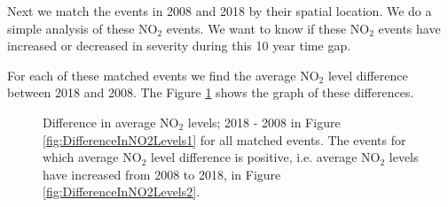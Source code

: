 \documentclass[11pt]{article}
\begin{document}
	
	Next we match the events in 2008 and 2018 by their spatial location. We do a simple analysis of these $\text{NO}_2$ events. We want to know if these  $\text{NO}_2$ events have increased or decreased in severity during this 10 year time gap. 

	
	For each of these matched events we find the  average $\text{NO}_2$ level difference between 2018 and 2008. The Figure \ref{fig:DifferenceInNO2Levels} shows the graph of these differences. 
	
	\begin{figure}[H]
		\centering
		\caption{\footnotesize Difference in average  $\text{NO}_2$ levels; 2018 - 2008 in Figure \ref{fig:DifferenceInNO2Levels1} for all matched events. The events for which average $\text{NO}_2$ level difference is positive, i.e. average $\text{NO}_2$ levels have increased from 2008 to 2018, in Figure \ref{fig:DifferenceInNO2Levels2}.}
		\label{fig:DifferenceInNO2Levels}
	\end{figure}
	
\end{document}
